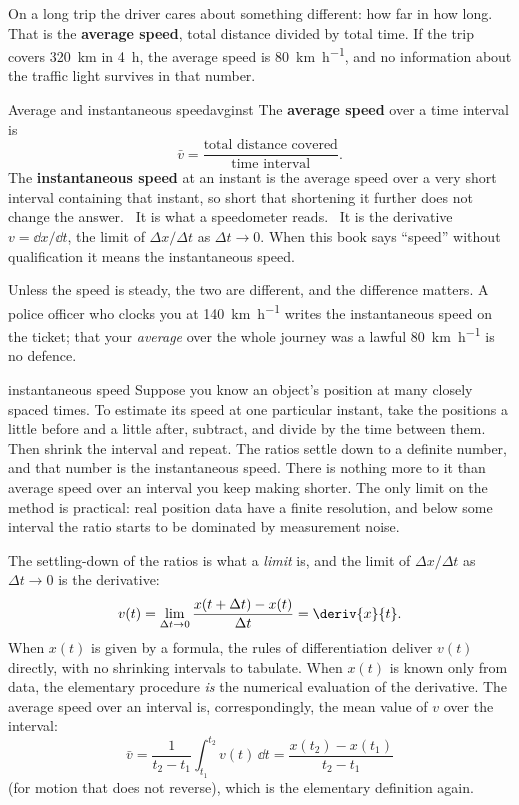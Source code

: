 On a long trip the driver cares about something different: how far in how long. That is the \textbf{average speed}, total distance divided by total time. If the trip covers \SI{320}{\kilo\metre} in \SI{4}{\hour}, the average speed is \SI{80}{\kilo\metre\per\hour}, and no information about the traffic light survives in that number.

\begin{definition}{Average and instantaneous speed}{avginst}
The \textbf{average speed} over a time interval is
\[
\bar v = \frac{\text{total distance covered}}{\text{time interval}}.
\]
The \textbf{instantaneous speed} at an instant is the average speed over a very short interval containing that instant, so short that shortening it further does not change the answer. \elemtag\ It is what a speedometer reads. \calctag\ It is the derivative $v = \dd x/\dd t$, the limit of $\Delta x/\Delta t$ as $\Delta t \to 0$. When this book says ``speed'' without qualification it means the instantaneous speed.
\end{definition}

Unless the speed is steady, the two are different, and the difference matters. A police officer who clocks you at \SI{140}{\kilo\metre\per\hour} writes the instantaneous speed on the ticket; that your \emph{average} over the whole journey was a lawful \SI{80}{\kilo\metre\per\hour} is no defence.

\begin{twoviews}{instantaneous speed}
\elem Suppose you know an object's position at many closely spaced times. To estimate its speed at one particular instant, take the positions a little before and a little after, subtract, and divide by the time between them. Then shrink the interval and repeat. The ratios settle down to a definite number, and that number is the instantaneous speed. There is nothing more to it than average speed over an interval you keep making shorter. The only limit on the method is practical: real position data have a finite resolution, and below some interval the ratio starts to be dominated by measurement noise.

\calc The settling-down of the ratios is what a \emph{limit} is, and the limit of $\Delta x/\Delta t$ as $\Delta t \to 0$ is the derivative:
\[
v(t) = \lim_{\Delta t \to 0}\frac{x(t + \Delta t) - x(t)}{\Delta t} = \deriv{x}{t}.
\]
When $x(t)$ is given by a formula, the rules of differentiation deliver $v(t)$ directly, with no shrinking intervals to tabulate. When $x(t)$ is known only from data, the elementary procedure \emph{is} the numerical evaluation of the derivative. The average speed over an interval is, correspondingly, the mean value of $v$ over the interval:
\[
\bar v = \frac{1}{t_2 - t_1}\int_{t_1}^{t_2} v(t)\,\dd t = \frac{x(t_2) - x(t_1)}{t_2 - t_1}
\]
(for motion that does not reverse), which is the elementary definition again.
\end{twoviews}

